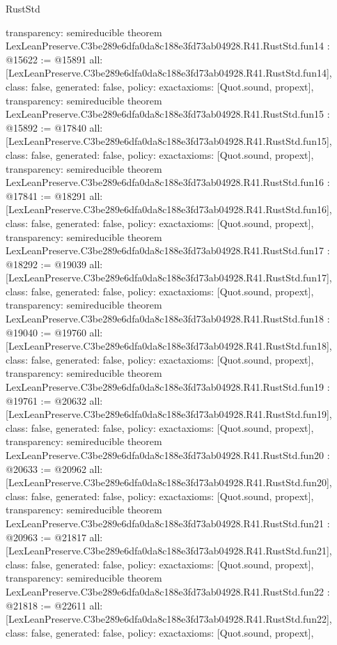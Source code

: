 \begin{lexlean}{RustStd}
\begin{coremodule}
{  transparency: semireducible
}
theorem LexLeanPreserve.C3be289e6dfa0da8c188e3fd73ab04928.R41.RustStd.fun14 : @15622 := @15891 {
  all: [LexLeanPreserve.C3be289e6dfa0da8c188e3fd73ab04928.R41.RustStd.fun14],
  class: false,
  generated: false,
  policy: exact{axioms: [Quot.sound, propext]},
  transparency: semireducible
}
theorem LexLeanPreserve.C3be289e6dfa0da8c188e3fd73ab04928.R41.RustStd.fun15 : @15892 := @17840 {
  all: [LexLeanPreserve.C3be289e6dfa0da8c188e3fd73ab04928.R41.RustStd.fun15],
  class: false,
  generated: false,
  policy: exact{axioms: [Quot.sound, propext]},
  transparency: semireducible
}
theorem LexLeanPreserve.C3be289e6dfa0da8c188e3fd73ab04928.R41.RustStd.fun16 : @17841 := @18291 {
  all: [LexLeanPreserve.C3be289e6dfa0da8c188e3fd73ab04928.R41.RustStd.fun16],
  class: false,
  generated: false,
  policy: exact{axioms: [Quot.sound, propext]},
  transparency: semireducible
}
theorem LexLeanPreserve.C3be289e6dfa0da8c188e3fd73ab04928.R41.RustStd.fun17 : @18292 := @19039 {
  all: [LexLeanPreserve.C3be289e6dfa0da8c188e3fd73ab04928.R41.RustStd.fun17],
  class: false,
  generated: false,
  policy: exact{axioms: [Quot.sound, propext]},
  transparency: semireducible
}
theorem LexLeanPreserve.C3be289e6dfa0da8c188e3fd73ab04928.R41.RustStd.fun18 : @19040 := @19760 {
  all: [LexLeanPreserve.C3be289e6dfa0da8c188e3fd73ab04928.R41.RustStd.fun18],
  class: false,
  generated: false,
  policy: exact{axioms: [Quot.sound, propext]},
  transparency: semireducible
}
theorem LexLeanPreserve.C3be289e6dfa0da8c188e3fd73ab04928.R41.RustStd.fun19 : @19761 := @20632 {
  all: [LexLeanPreserve.C3be289e6dfa0da8c188e3fd73ab04928.R41.RustStd.fun19],
  class: false,
  generated: false,
  policy: exact{axioms: [Quot.sound, propext]},
  transparency: semireducible
}
theorem LexLeanPreserve.C3be289e6dfa0da8c188e3fd73ab04928.R41.RustStd.fun20 : @20633 := @20962 {
  all: [LexLeanPreserve.C3be289e6dfa0da8c188e3fd73ab04928.R41.RustStd.fun20],
  class: false,
  generated: false,
  policy: exact{axioms: [Quot.sound, propext]},
  transparency: semireducible
}
theorem LexLeanPreserve.C3be289e6dfa0da8c188e3fd73ab04928.R41.RustStd.fun21 : @20963 := @21817 {
  all: [LexLeanPreserve.C3be289e6dfa0da8c188e3fd73ab04928.R41.RustStd.fun21],
  class: false,
  generated: false,
  policy: exact{axioms: [Quot.sound, propext]},
  transparency: semireducible
}
theorem LexLeanPreserve.C3be289e6dfa0da8c188e3fd73ab04928.R41.RustStd.fun22 : @21818 := @22611 {
  all: [LexLeanPreserve.C3be289e6dfa0da8c188e3fd73ab04928.R41.RustStd.fun22],
  class: false,
  generated: false,
  policy: exact{axioms: [Quot.sound, propext]},
}
\end{coremodule}
\end{lexlean}

